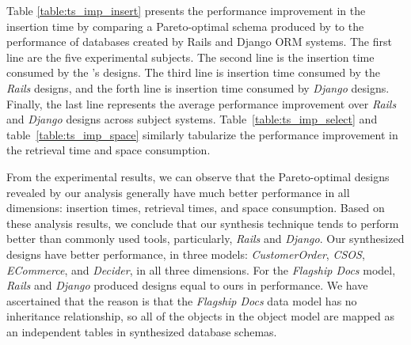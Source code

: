 \documentclass{sig-alternate}
\begin{document}

Table \ref{table:ts_imp_insert} presents the performance improvement in the insertion time by comparing a Pareto-optimal schema produced by \@approach to the performance of databases created by   Rails and Django ORM systems. The first line are the five experimental subjects. The second line is the insertion time consumed by the \@approach's designs. The third line is insertion time consumed by the {\em Rails} designs, and the forth line is insertion time consumed by {\em Django} designs. Finally, the last line represents the average performance improvement over {\em Rails} and {\em Django} designs across subject systems. %
Table~\ref{table:ts_imp_select} and table~\ref{table:ts_imp_space} similarly tabularize the performance improvement in the retrieval time and space consumption. %

From the experimental results, we can observe that the Pareto-optimal designs revealed by our analysis generally have much better performance in all dimensions: insertion times, retrieval times, and space consumption. Based on these analysis results, we conclude that our synthesis technique tends to perform better than commonly used tools, particularly, {\em Rails} and {\em Django}. Our synthesized designs have better performance, in three models: {\em CustomerOrder}, {\em CSOS}, {\em ECommerce}, and {\em Decider}, in all three dimensions. For the {\em Flagship Docs} model, {\em Rails} and {\em Django} produced designs equal to ours in performance. We have ascertained that the reason is that the {\em Flagship Docs} data model has no inheritance relationship, so all of the objects in the object model are mapped as an independent tables in synthesized database schemas.
\end{document}
